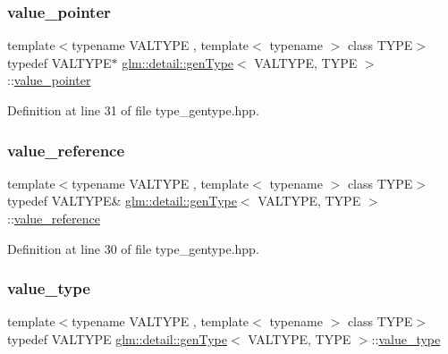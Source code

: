 \subsubsection{\texorpdfstring{value\_pointer}{value\_pointer}}
{\footnotesize\ttfamily template$<$typename V\+A\+L\+T\+Y\+PE , template$<$ typename $>$ class T\+Y\+PE$>$ \\
typedef V\+A\+L\+T\+Y\+PE$\ast$ \mbox{\hyperlink{structglm_1_1detail_1_1gen_type}{glm\+::detail\+::gen\+Type}}$<$ V\+A\+L\+T\+Y\+PE, T\+Y\+PE $>$\+::\mbox{\hyperlink{structglm_1_1detail_1_1gen_type_a3b272e7be29ab920f2877c00646f6f9b}{value\+\_\+pointer}}}



Definition at line 31 of file type\+\_\+gentype.\+hpp.

\mbox{\label{structglm_1_1detail_1_1gen_type_a557d18598a777df9f16fa1bd7c637ca4}} 
\subsubsection{\texorpdfstring{value\_reference}{value\_reference}}
{\footnotesize\ttfamily template$<$typename V\+A\+L\+T\+Y\+PE , template$<$ typename $>$ class T\+Y\+PE$>$ \\
typedef V\+A\+L\+T\+Y\+PE\& \mbox{\hyperlink{structglm_1_1detail_1_1gen_type}{glm\+::detail\+::gen\+Type}}$<$ V\+A\+L\+T\+Y\+PE, T\+Y\+PE $>$\+::\mbox{\hyperlink{structglm_1_1detail_1_1gen_type_a557d18598a777df9f16fa1bd7c637ca4}{value\+\_\+reference}}}



Definition at line 30 of file type\+\_\+gentype.\+hpp.

\mbox{\label{structglm_1_1detail_1_1gen_type_ad59e126a45bca74a36732a30cdaee520}} 
\subsubsection{\texorpdfstring{value\_type}{value\_type}}
{\footnotesize\ttfamily template$<$typename V\+A\+L\+T\+Y\+PE , template$<$ typename $>$ class T\+Y\+PE$>$ \\
typedef V\+A\+L\+T\+Y\+PE \mbox{\hyperlink{structglm_1_1detail_1_1gen_type}{glm\+::detail\+::gen\+Type}}$<$ V\+A\+L\+T\+Y\+PE, T\+Y\+PE $>$\+::\mbox{\hyperlink{structglm_1_1detail_1_1gen_type_ad59e126a45bca74a36732a30cdaee520}{value\+\_\+type}}}



